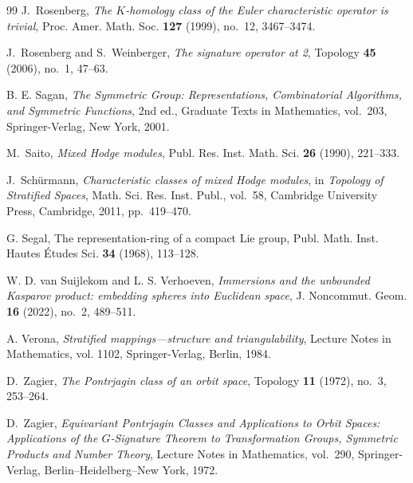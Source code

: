 \documentclass[11pt,leqno,twoside]{amsart}
\theoremstyle{plainsl}
\theoremstyle{definition}
\begin{document}
\begin{thebibliography}{99}
J.~Rosenberg,
\textit{The $K$-homology class of the Euler characteristic operator is trivial},
Proc. Amer. Math. Soc. \textbf{127} (1999), no.~12, 3467--3474.

J.~Rosenberg and S.~Weinberger,
\emph{The signature operator at 2},
Topology \textbf{45} (2006), no.~1, 47--63.


B. E. Sagan,
\textit{The Symmetric Group: Representations,
Combinatorial Algorithms, and Symmetric Functions},
2nd ed., Graduate Texts in Mathematics, vol.~203,
Springer-Verlag, New York, 2001.

M.~Saito,
\emph{Mixed Hodge modules},
Publ. Res. Inst. Math. Sci. \textbf{26} (1990), 221--333.

J.~Sch\"urmann,
\emph{Characteristic classes of mixed Hodge modules},
in \emph{Topology of Stratified Spaces},
Math. Sci. Res. Inst. Publ., vol.~58,
Cambridge University Press, Cambridge, 2011, pp.~419--470.

G. Segal,
The representation-ring of a compact Lie group,
Publ. Math. Inst. Hautes Études Sci. \textbf{34} (1968), 113--128.


W. D. van Suijlekom and L. S. Verhoeven,
\textit{Immersions and the unbounded Kasparov product:
embedding spheres into Euclidean space},
J. Noncommut. Geom. \textbf{16} (2022), no.~2,
489--511.


A. Verona,
\textit{Stratified mappings---structure and triangulability},
Lecture Notes in Mathematics, vol. 1102,
Springer-Verlag, Berlin, 1984.



D.~Zagier,
\emph{The Pontrjagin class of an orbit space},
Topology \textbf{11} (1972), no.~3, 253--264.

D.~Zagier,
\textit{Equivariant Pontrjagin Classes and Applications to Orbit Spaces:
Applications of the $G$-Signature Theorem to Transformation Groups,
Symmetric Products and Number Theory},
Lecture Notes in Mathematics, vol.~290,
Springer-Verlag, Berlin--Heidelberg--New York, 1972.

\end{thebibliography}
\end{document}
